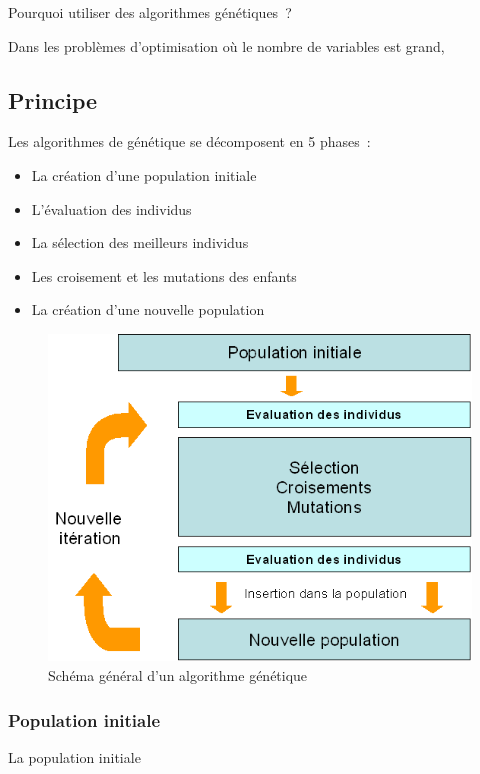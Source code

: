 \documentclass{article}
\begin{document}
	Pourquoi utiliser des algorithmes génétiques ?

	Dans les problèmes d'optimisation où le nombre de variables est grand, 

	\subsection{Principe}
	Les algorithmes de génétique se décomposent en 5 phases :
	\begin{itemize}
	\item La création d'une population initiale
	\item L'évaluation des individus
	\item La sélection des meilleurs individus
	\item Les croisement et les mutations des enfants
	\item La création d'une nouvelle population
	\end{itemize}

	\begin{figure}
		\begin{center}
			\includegraphics[scale=0.5]{schema_gen.png}
		\end{center}

		\caption{Schéma général d'un algorithme génétique}

		\label{Schéma général d'un algorithme génétique}
	\end{figure}


		\subsubsection{Population initiale}
		La population initiale 
\end{document}
